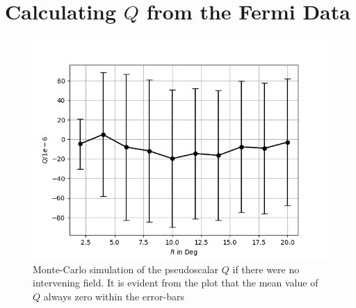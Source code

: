 \documentclass[english]{article}
\begin{document}
\section{Calculating $Q$ from the Fermi Data}
\begin{figure}
	\label{fig:montecarlo}
	\centering
	\includegraphics[scale=0.5]{montecarlo.png}
	\caption{Monte-Carlo simulation of the pseudoscalar $Q$ if there were no
	intervening field. It is evident from the plot that the mean value of $Q$
	always zero within the error-bars}
\end{figure}
\end{document}
